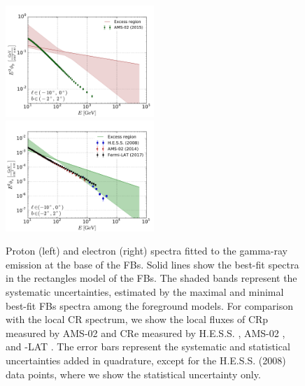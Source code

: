 \begin{figure}[h]
\includegraphics[width=0.5\textwidth]{plots/Summary_proton_spectra_0.pdf}
\includegraphics[width=0.5\textwidth]{plots/Summary_electron_spectra_0.pdf}
  	\caption{
	Proton (left) and electron (right) spectra fitted to the gamma-ray emission at the base of the FBs.
	Solid lines show the best-fit spectra in the rectangles model of the FBs.
	The shaded bands represent the systematic uncertainties, 
	estimated by the maximal and minimal best-fit FBs spectra among the foreground models. 
	For comparison with the local CR spectrum, we show the local fluxes of CRp  measured by AMS-02 \citep{2015PhRvL.114q1103A} and 
	CRe measured by H.E.S.S. \citep{2008PhRvL.101z1104A}, AMS-02 \citep{2014PhRvL.113v1102A}, 
	and \Fermi-LAT \citep{2017PhRvD..95h2007A}.
	The error bars represent the systematic and statistical uncertainties added in quadrature, except for the H.E.S.S. (2008) data points,
	where we show the statistical uncertainty only.}
  	\label{fig:Particle_spectra}
\end{figure}

